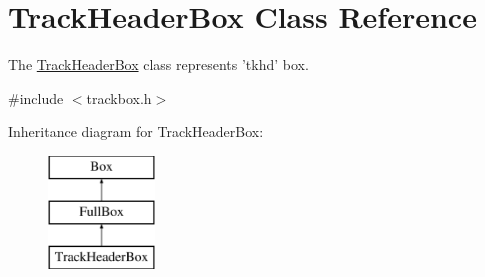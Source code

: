 \hypertarget{class_track_header_box}{\section{Track\-Header\-Box Class Reference}
\label{class_track_header_box}
}


The \hyperlink{class_track_header_box}{Track\-Header\-Box} class represents 'tkhd' box.  




{\ttfamily \#include $<$trackbox.\-h$>$}

Inheritance diagram for Track\-Header\-Box\-:\begin{figure}[H]
\begin{center}
\leavevmode
\includegraphics[height=3.000000cm]{class_track_header_box}
\end{center}
\end{figure}
